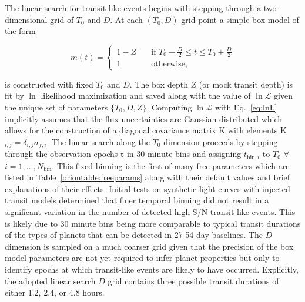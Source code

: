 The linear search for transit-like events begins with stepping through
a two-dimensional grid of $T_0$ and $D$. At each $(T_0,D)$ grid point a simple box model of the form

\begin{equation}
  m(t) =
  \begin{cases}
    1-Z & \quad \text{if } T_0-\frac{D}{2} \leq t \leq T_0+\frac{D}{2} \\
    1 & \quad \text{otherwise,}
  \end{cases}
\end{equation}

\noindent is constructed with fixed $T_0$ and $D$. The box depth $Z$ (or mock transit depth)
is fit by $\ln$ likelihood maximization and saved along with the value of $\ln{\mathcal{L}}$
given the unique set of parameters $\{T_0,D,Z\}$. Computing $\ln{\mathcal{L}}$ with Eq.~\ref{eq:lnL}
implicitly assumes that the flux uncertainties are Gaussian distributed which allows for the
construction of a diagonal covariance matrix K with elements K$_{i,j} = \delta_{i,j} \sigma_{f,i}$.
The linear search along the $T_0$ dimension proceeds by stepping through the observation epochs
$\mathbf{t}$ in 30 minute bins and assigning
$t_{\text{bin},i}$ to $T_0$ $\forall$ $i=1,\dots,N_{\text{bin}}$.
This fixed binning is the first of many \pipeline{} free parameters which are listed in
Table~\ref{oriontable:freeparams} along with their default values and brief explanations of their
effects. Initial \pipeline{} tests on synthetic light curves with injected transit models
determined that finer temporal binning did not result in a significant variation in the number
of detected high S/N transit-like events. This is likely due to 30 minute bins being more comparable
to typical transit durations of the types of planets that can be detected in 27-54 day baselines.
The $D$ dimension is sampled on a much coarser grid
given that the precision of the box model parameters are not yet required to infer planet properties
but only to identify epochs at which transit-like events are likely to have occurred. Explicitly, the
adopted linear search $D$ grid contains three possible transit durations of either 1.2, 2.4, or 4.8 hours. \\



